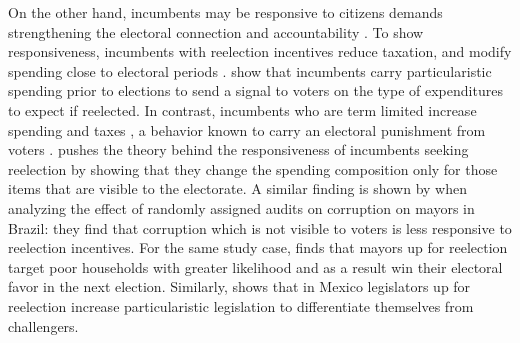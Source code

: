 \documentclass[12pt]{amsart}
\numberwithin{equation}{section}
\theoremstyle{definition}
\theoremstyle{definition}
\theoremstyle{definition}
\begin{document}
On the other hand, incumbents may be responsive to citizens demands strengthening the electoral connection and accountability \citep{mayhew_1974, manin_etal_1999, cox_katz_2002}. To show responsiveness, incumbents with reelection incentives reduce taxation, and modify spending close to electoral periods \citep{Rogoff_1988, Rogoff_1990, klein_sakurai_2015}. \citet{Drazen_eslava_2005} show that incumbents carry particularistic spending prior to elections to send a signal to voters on the type of expenditures to expect if reelected. In contrast, incumbents who are term limited increase spending and taxes \citep{Besley_case_1995}, a behavior known to carry an electoral punishment from voters \citep{peltzman_1992}. \citet{akhmedov_2004} pushes the theory behind the responsiveness of incumbents seeking reelection by showing that they change the spending composition only for those items that are visible to the electorate. A similar finding is shown by \citet{ferraz_finan_2011} when analyzing the effect of randomly assigned audits on corruption on mayors in Brazil: they find that corruption which is not visible to voters is less responsive to reelection incentives. For the same study case, \citet{frey_2021} finds that mayors up for reelection target poor households with greater likelihood and as a result win their electoral favor in the next election. Similarly, \citet{motolinia_2020} shows that in Mexico legislators up for reelection increase particularistic legislation to differentiate themselves from challengers. 
\end{document}
